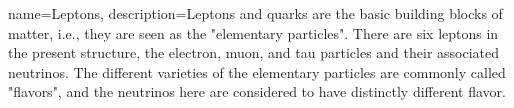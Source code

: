 {
    name=Leptons,
    description={Leptons and quarks are the basic building blocks of matter, i.e., they are seen as the "elementary particles". There are six leptons in the present structure, the electron, muon, and tau particles and their associated neutrinos. The different varieties of the elementary particles are commonly called "flavors", and the neutrinos here are considered to have distinctly different flavor.}
}
